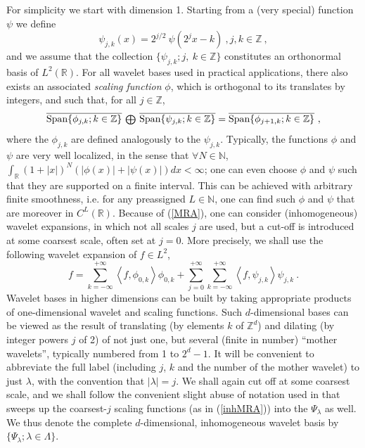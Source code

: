 \documentclass[10pt]{article}
\def\R{\mathbb{R}}
\def\N{\mathbb{N}}
\def\Z{\mathbb{Z}}
\newcommand\eref[1]{(\ref{#1})}
\begin{document}
For simplicity we start with dimension 1.  Starting from a (very special)
function
$\psi$ we define\begin{equation*}\psi_{j,k}(x)= 2^{j/2}\ \psi(2^j x-k) ~,
j,k \in \Z~,\end{equation*}
and we assume that the collection $\{\psi_{j,k}; j,~k \in \Z\}$
constitutes an orthonormal basis of $L^2(\mathbb R)$.
For all wavelet bases used in practical applications, there also exists an
associated
{\em scaling function} $\phi$, which is orthogonal to its
translates by integers, and such
that, for all $j \in \Z$,
\begin{equation}
\label{MRA}
\overline{\mbox{Span}\{\phi_{j,k}; k \in \Z\}}~\mbox{\small{$\bigoplus$}}
~\overline
{\mbox{Span}\{\psi_{j,k}; k \in \Z\}}
= \overline{\mbox{Span}\{\phi_{j+1,k}; k \in \Z\}} ~,
\end{equation}
where the $\phi_{j,k}$ are defined analogously to the $\psi_{j,k}$.
Typically, the functions $\phi$ and $\psi$ are very well localized, in the
sense
that $\forall N \in \N$, $\int_{\R} (1+|x|)^N(|\phi(x)|+|\psi(x)|) dx <
\infty$;
one can even
choose $\phi$ and $\psi$ such that they are supported on a finite interval.
This can be
achieved with arbitrary finite smoothness, i.e. for any preassigned $L \in
\N$, one can
find such $\phi$ and $\psi$ that are moreover in $C^L(\R)$. Because of
\eref{MRA},
one can consider (inhomogeneous) wavelet expansions, in which not all
scales $j$
are used,
but a cut-off is introduced at some coarsest scale, often set at $j=0$.
More precisely,
we shall use the following wavelet expansion
of $f
\in L^2$,
\begin{equation}
\label{inhMRA}
 f= \sum_{k=-\infty}^{+\infty}  \left<f,\phi_{0,k}\right> \phi_{0,k} +
\sum_{j=0}^{+\infty}
\sum_{k=-\infty}^{+\infty} \left<f,\psi_{j,k}\right> \psi_{j,k}~.
\end{equation}
Wavelet bases in
higher dimensions can be built by taking appropriate products of
one-dimensional
wavelet and scaling functions. Such $d$-dimensional bases can be viewed as the
result of translating (by elements $k$ of $\Z^d$) and
dilating (by integer powers $j$ of 2) of
not just one, but several
(finite in number) ``mother wavelets'', typically numbered from
1 to $2^d-1$.
It will be convenient to abbreviate the full label (including $j$,  $k$ and the
number of the mother wavelet) to just $\lambda$, with the convention that
$|\lambda|=j$.
We shall again cut off at some coarsest scale, and we shall follow the
convenient
slight abuse
of notation used in \cite{Coh00} that sweeps up the coarsest-$j$
scaling functions
(as in \eref{inhMRA}) into the $\Psi_{\lambda}$ as well. We thus denote the
complete
$d$-dimensional, inhomogeneous wavelet basis by
$\{\Psi_{\lambda}; \lambda \in \Lambda\}$.
\end{document}
